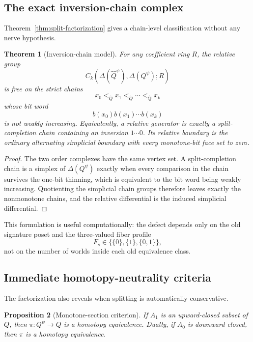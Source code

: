\documentclass[11pt]{article}
\newtheorem{theorem}{Theorem}[section]
\newtheorem{proposition}[theorem]{Proposition}
\begin{document}
\subsection{The exact inversion-chain complex}

Theorem~\ref{thm:split-factorization} gives a chain-level classification without
any nerve hypothesis.

\begin{theorem}[Inversion-chain model]\label{thm:inversion-chain}
For any coefficient ring $R$, the relative group
\[
 C_k\!\left(\Delta(\widehat Q^\psi),\Delta(Q^\psi);R\right)
\]
is free on the strict chains
\[
 x_0<_{\widehat Q}x_1<_{\widehat Q}\cdots<_{\widehat Q}x_k
\]
whose bit word
\[
 b(x_0)b(x_1)\cdots b(x_k)
\]
is not weakly increasing.  Equivalently, a relative generator is exactly a
split-completion chain containing an inversion $1\cdots0$.  Its relative boundary
is the ordinary alternating simplicial boundary with every monotone-bit face set
to zero.
\end{theorem}

\begin{proof}
The two order complexes have the same vertex set.  A split-completion chain is a
simplex of $\Delta(Q^\psi)$ exactly when every comparison in the chain survives
the one-bit thinning, which is equivalent to the bit word being weakly increasing.
Quotienting the simplicial chain groups therefore leaves exactly the nonmonotone
chains, and the relative differential is the induced simplicial differential.
\end{proof}

This formulation is useful computationally: the defect depends only on the old
signature poset and the three-valued fiber profile
\[
 F_s\in\bigl\{\{0\},\{1\},\{0,1\}\bigr\},
\]
not on the number of worlds inside each old equivalence class.

\subsection{Immediate homotopy-neutrality criteria}

The factorization also reveals when splitting is automatically conservative.

\begin{proposition}[Monotone-section criterion]\label{prop:monotone-section}
If $A_1$ is an upward-closed subset of $Q$, then $\pi:Q^\psi\to Q$ is a
homotopy equivalence.  Dually, if $A_0$ is downward closed, then $\pi$ is a
homotopy equivalence.
\end{proposition}
\end{document}
